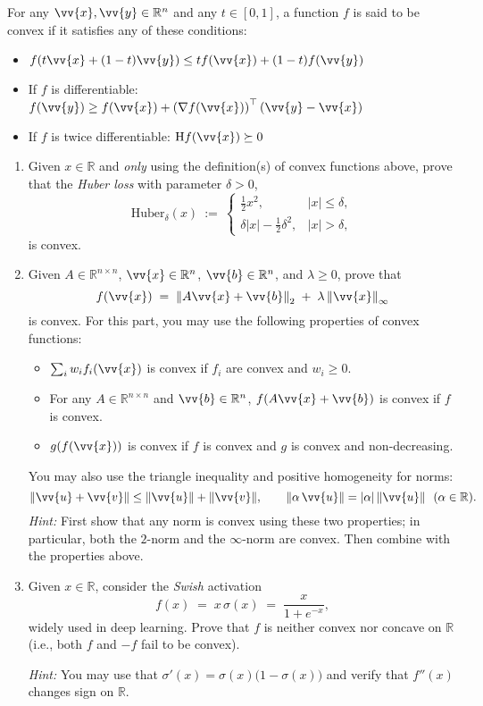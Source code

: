 
For any $\vv{x}, \vv{y} \in \mathbb{R}^{n}$ and any $t \in [0,1]$, a function $f$ is said to be convex if it satisfies any of these conditions:
\begin{itemize}
\item $f(t\vv{x}+(1-t)\vv{y}) \le tf(\vv{x}) + (1-t)f(\vv{y})$ 
\item If $f$ is differentiable: $f(\vv{y}) \ge f(\vv{x}) + \left(\nabla f(\vv{x})\right)^\top  (\vv{y} - \vv{x})$
\item If $f$ is twice differentiable: $\mathrm{H} f(\vv{x}) \succeq 0$
\end{itemize}

\begin{enumerate}
\item Given $x \in \mathbb{R}$ and \emph{only} using the definition(s) of convex functions above, prove that the \emph{Huber loss} with parameter $\delta>0$,
\[
\mathrm{Huber}_\delta(x)\ :=\
\begin{cases}
\frac{1}{2}x^2, & |x|\le \delta,\\[4pt]
\delta|x|-\frac{1}{2}\delta^2, & |x|>\delta,
\end{cases}
\]
is convex.

\color{black}
\item Given $A \in \mathbb{R}^{n \times n}$, $\vv{x} \in \mathbb{R}^{n}$, $\vv{b} \in \mathbb{R}^{n}$, and $\lambda \ge 0$, prove that
\[
f(\vv{x}) \;=\; \left\| A\vv{x} + \vv{b}\right\|_2 \;+\; \lambda \left\| \vv{x}\right\|_\infty
\]
is convex. For this part, you may use the following properties of convex functions:
\begin{itemize}
\item $\sum_i w_i f_i(\vv{x})$ is convex if $f_i$ are convex and $w_i \ge 0$.
\item For any $A \in \mathbb{R}^{n \times n}$ and $\vv{b} \in \mathbb{R}^{n}$, $f(A\vv{x}+\vv{b})$ is convex if $f$ is convex.
\item $g(f(\vv{x}))$ is convex if $f$ is convex and $g$ is convex and non-decreasing.
\end{itemize}
You may also use the triangle inequality and positive homogeneity for norms:
\[
\| \vv{u}+\vv{v}\|\le\|\vv{u}\|+\|\vv{v}\|, \qquad \|\alpha\,\vv{u}\|=|\alpha|\,\|\vv{u}\| \ \ (\alpha\in\mathbb{R}).
\]
\emph{Hint:} First show that any norm is convex using these two properties; in particular, both the $2$-norm and the $\infty$-norm are convex. Then combine with the properties above.

\color{black}
\item Given $x \in \mathbb{R}$, consider the \emph{Swish} activation
\[
f(x)\;=\;x\,\sigma(x)\;=\;\frac{x}{1+e^{-x}},
\]
widely used in deep learning. Prove that $f$ is neither convex nor concave on $\mathbb{R}$ (i.e., both $f$ and $-f$ fail to be convex).

\emph{Hint:} You may use that $\sigma'(x)=\sigma(x)\bigl(1-\sigma(x)\bigr)$ and verify that $f''(x)$ changes sign on $\mathbb{R}$.
\color{black}
\end{enumerate}
